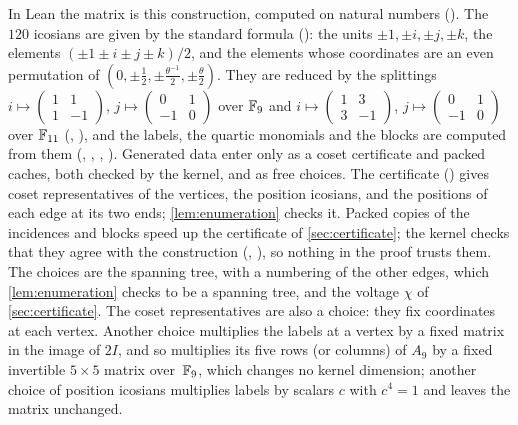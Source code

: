 In Lean the matrix is this construction, computed on natural numbers ().
The $120$ icosians are given by the standard formula (): the units $\pm1,\pm i,\pm j,\pm k$, the
elements $(\pm1\pm i\pm j\pm k)/2$, and the elements whose coordinates are an even permutation of
$(0,\pm\frac12,\pm\frac{\theta^{-1}}2,\pm\frac\theta2)$. They are reduced by the splittings $i\mapsto(\begin{smallmatrix}1&1\\1&-1\end{smallmatrix})$,
$j\mapsto(\begin{smallmatrix}0&1\\-1&0\end{smallmatrix})$ over $\mathbb{F}_9$ and $i\mapsto(\begin{smallmatrix}1&3\\3&-1\end{smallmatrix})$,
$j\mapsto(\begin{smallmatrix}0&1\\-1&0\end{smallmatrix})$ over $\mathbb{F}_{11}$ (, ), and the
labels, the quartic monomials and the blocks are computed from them (, ,
, ). Generated data enter only as a coset certificate and packed caches,
both checked by the kernel, and as free choices. The certificate () gives coset representatives of the
vertices, the position icosians, and the positions of each edge at its two ends; \cref{lem:enumeration} checks it. Packed
copies of the incidences and blocks speed up the certificate of \cref{sec:certificate}; the kernel checks that they agree
with the construction (, ), so nothing in the proof
trusts them. The choices are the spanning tree, with a numbering of the other edges, which \cref{lem:enumeration} checks
to be a spanning tree, and the voltage $\chi$ of \cref{sec:certificate}. The coset representatives are also a choice: they
fix coordinates at each vertex. Another choice multiplies the labels at a vertex by a fixed matrix in the image of $2I$,
and so multiplies its five rows (or columns) of $A_9$ by a fixed invertible $5\times5$ matrix over~$\mathbb{F}_9$, which changes no
kernel dimension; another choice of position icosians multiplies labels by scalars $c$ with $c^4=1$ and leaves the matrix
unchanged.

